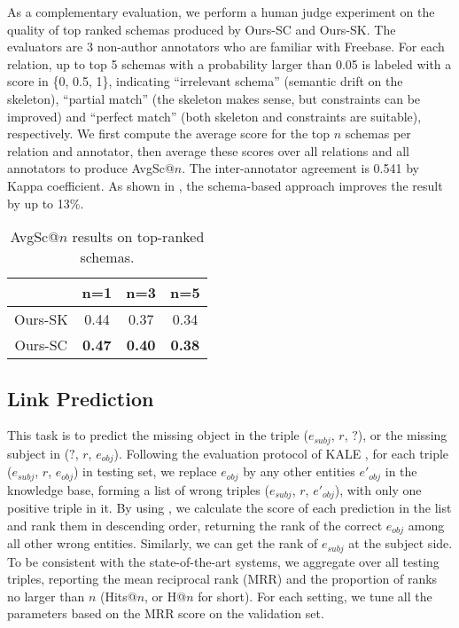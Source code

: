 As a complementary evaluation, we perform a human judge experiment
on the quality of top ranked schemas produced by Ours-SC and Ours-SK.
The evaluators are 3 non-author annotators who are familiar with Freebase.
For each relation, up to top 5 schemas with a probability larger than 0.05 is
labeled with a score in \{0, 0.5, 1\},
indicating ``irrelevant schema'' (semantic drift on the skeleton),
``partial match'' (the skeleton makes sense, but constraints can be improved) and
``perfect match'' (both skeleton and constraints are suitable), respectively.
We first compute the average score for the top $n$ schemas per relation and annotator,
then average these scores over all relations and all annotators to produce
AvgSc@$n$.
The inter-annotator agreement is 0.541 by Kappa coefficient.
As shown in , the schema-based approach
improves the result by up to 13\%.

\begin{table}[t]
	\small
	\centering
	\caption{AvgSc@$n$ results on top-ranked schemas.}
	\label{tab:average-score}
	\begin{tabular}{c|ccc}
						&	n=1		&	n=3		&	n=5			\\
		\hline
		Ours-SK			&	0.44	&	0.37	&	0.34		\\
		Ours-SC			&	\textbf{0.47}	&	\textbf{0.40}	&	\textbf{0.38}
	\end{tabular}
\end{table}


\subsection{Link Prediction}
This task is to predict the missing object in the triple ($e_{subj}$, $r$, $?$),
or the missing subject in ($?$, $r$, $e_{obj}$).
Following the evaluation protocol of KALE \cite{guo2016jointly},
for each triple ($e_{subj}$, $r$, $e_{obj}$) in testing set,
we replace $e_{obj}$ by any other entities $e'_{obj}$ in the knowledge base,
forming a list of wrong triples ($e_{subj}$, $r$, $e'_{obj}$), with only one
positive triple in it.
By using , we calculate the score of each prediction in the list
and rank them in descending order,
returning the rank of the correct $e_{obj}$ among all other wrong entities.
Similarly, we can get the rank of $e_{subj}$ at the subject side.
To be consistent with the state-of-the-art systems, we aggregate over all testing triples,
reporting the mean reciprocal rank (MRR)
and the proportion of ranks no larger than $n$ (Hits@$n$, or H@$n$ for short).
For each setting, we tune all the parameters based on the MRR score on the validation set.

